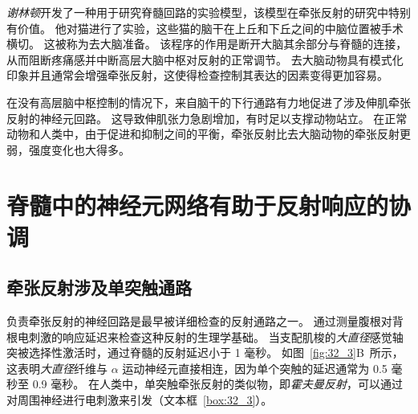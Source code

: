 \textit{谢林顿}开发了一种用于研究脊髓回路的实验模型，该模型在牵张反射的研究中特别有价值。
他对猫进行了实验，这些猫的脑干在上丘和下丘之间的中脑位置被手术横切。
这被称为去大脑准备。
该程序的作用是断开大脑其余部分与脊髓的连接，从而阻断疼痛感并中断高层大脑中枢对反射的正常调节。
去大脑动物具有模式化印象并且通常会增强牵张反射，这使得检查控制其表达的因素变得更加容易。


在没有高层脑中枢控制的情况下，来自脑干的下行通路有力地促进了涉及伸肌牵张反射的神经元回路。
这导致伸肌张力急剧增加，有时足以支撑动物站立。
在正常动物和人类中，由于促进和抑制之间的平衡，牵张反射比去大脑动物的牵张反射更弱，强度变化也大得多。



\section{脊髓中的神经元网络有助于反射响应的协调}

\subsection{牵张反射涉及单突触通路}

负责牵张反射的神经回路是最早被详细检查的反射通路之一。
通过测量腹根对背根电刺激的响应延迟来检查这种反射的生理学基础。
当支配肌梭的\textit{大直径}感觉轴突被选择性激活时，通过脊髓的反射延迟小于 1 毫秒。
如图~\ref{fig:32_3}B~所示，这表明\textit{大直径}纤维与 $ \alpha $ 运动神经元直接相连，因为单个突触的延迟通常为 0.5 毫秒至 0.9 毫秒。
在人类中，单突触牵张反射的类似物，即\textit{霍夫曼反射}，可以通过对周围神经进行电刺激来引发（文本框~\ref{box:32_3}）。


